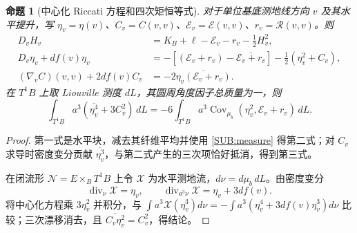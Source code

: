 \documentclass[UTF8,fontset=fandol,zihao=-4,oneside,openany]{ctexbook}
\theoremstyle{cjkplain}
\newtheorem{proposition}[theorem]{命题}
\numberwithin{equation}{chapter}
\begin{document}
\begin{proposition}[中心化 Riccati 方程和四次矩恒等式]\label{SUB:quartic}
对于单位基底测地线方向 $v$ 及其水平提升，写
$\eta_v=\eta(v)$、$C_v=C(v,v)$、$\mathcal E_v=\mathcal E(v,v)$、$r_v=\mathcal R(v,v)$。则
\begin{equation}\label{SUB:riccati}
\begin{aligned}
D_vH_v&=K_B+\ell-\mathcal E_v-r_v-\tfrac12H_v^2,\\
D_v\eta_v+df(v)\eta_v
&=-[(\mathcal E_v+r_v)-\overline{\mathcal E_v+r_v}]
-\tfrac12(\eta_v^2+C_v),\\
(\nabla_vC)(v,v)+2df(v)C_v
&=-2\overline{\eta_v(\mathcal E_v+r_v)}.
\end{aligned}
\end{equation}
在 $T^1B$ 上取 Liouville 测度 $dL$，其圆周角度因子总质量为一，则
\begin{equation}\label{SUB:quartic-id}
\int_{T^1B}a^3(\overline{\eta_v^4}+3C_v^2)\,dL
=-6\int_{T^1B}a^3
\operatorname{Cov}_{\mu_b}(\eta_v^2,\mathcal E_v+r_v)\,dL.
\end{equation}
\end{proposition}
\begin{proof}
第一式是水平块，减去其纤维平均并使用 \eqref{SUB:measure} 得第二式；对 $C_v$ 求导时密度变分贡献 $\overline{\eta_v^3}$，与第二式产生的三次项恰好抵消，得到第三式。

在闭流形 $\mathcal N=E\times_BT^1B$ 上令 $\mathcal X$ 为水平测地流，$d\nu=d\mu_b\,dL$。由密度变分
\[
\operatorname{div}_\nu\mathcal X=\eta_v,\qquad
\operatorname{div}_{a^3\nu}\mathcal X=\eta_v+3df(v).
\]
将中心化方程乘 $3\eta_v^2$ 并积分，与
$\int a^3\mathcal X(\eta_v^3)d\nu=-\int a^3(\eta_v^4+3df(v)\eta_v^3)d\nu$
比较；三次漂移消去，且 $\overline{C_v\eta_v^2}=C_v^2$，得结论。
\end{proof}
\end{document}
